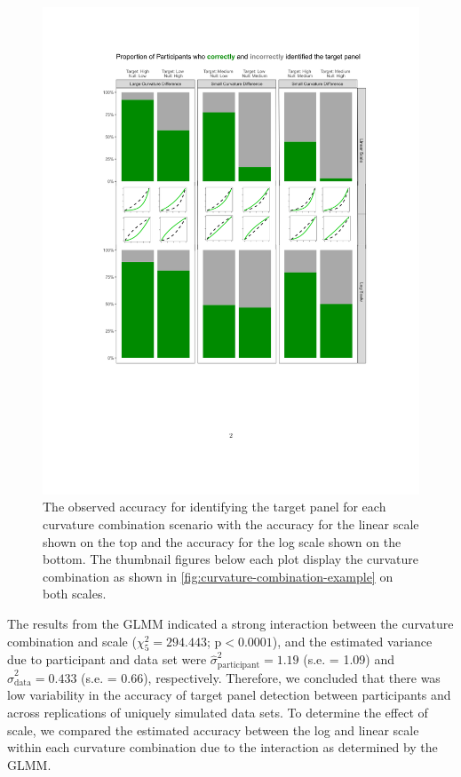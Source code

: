 \documentclass[12pt]{article}
\begin{document}
\begin{figure}[tbp]

{\centering \includegraphics[width=\linewidth,]{images/observed-proportions} 

}

\caption{The observed accuracy for identifying the target panel for each curvature combination scenario with the accuracy for the linear scale shown on the top and the accuracy for the log scale shown on the bottom. The thumbnail figures below each plot display the curvature combination as shown in \cref{fig:curvature-combination-example} on both scales.}\label{fig:obs-accuracy}
\end{figure}

The results from the GLMM indicated a strong interaction between the
curvature combination and scale (\(\chi^2_5 = 294.443\);
\(\text{p} <0.0001\)), and the estimated variance due to participant and
data set were \(\hat\sigma^2_{\text{participant}} = 1.19\) (s.e. = 1.09)
and \(\hat\sigma^2_{\text{data}} = 0.433\) (s.e. = 0.66), respectively.
Therefore, we concluded that there was low variability in the accuracy
of target panel detection between participants and across replications
of uniquely simulated data sets. To determine the effect of scale, we
compared the estimated accuracy between the log and linear scale within
each curvature combination due to the interaction as determined by the
GLMM.
\end{document}
